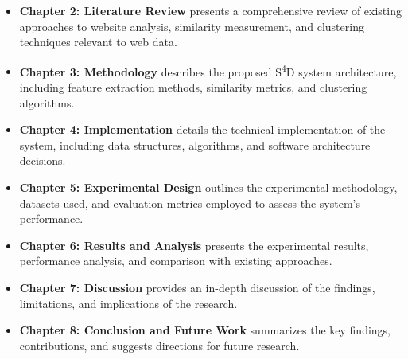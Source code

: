 \begin{itemize}
    \item \textbf{Chapter 2: Literature Review} presents a comprehensive review of existing approaches to website analysis, similarity measurement, and clustering techniques relevant to web data.
    
    \item \textbf{Chapter 3: Methodology} describes the proposed S\textsuperscript{4}D system architecture, including feature extraction methods, similarity metrics, and clustering algorithms.
    
    \item \textbf{Chapter 4: Implementation} details the technical implementation of the system, including data structures, algorithms, and software architecture decisions.
    
    \item \textbf{Chapter 5: Experimental Design} outlines the experimental methodology, datasets used, and evaluation metrics employed to assess the system's performance.
    
    \item \textbf{Chapter 6: Results and Analysis} presents the experimental results, performance analysis, and comparison with existing approaches.
    
    \item \textbf{Chapter 7: Discussion} provides an in-depth discussion of the findings, limitations, and implications of the research.
    
    \item \textbf{Chapter 8: Conclusion and Future Work} summarizes the key findings, contributions, and suggests directions for future research.
\end{itemize} 